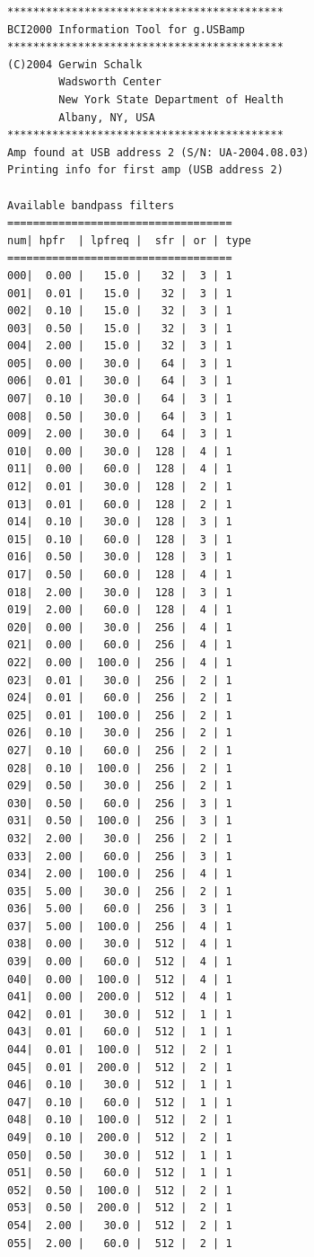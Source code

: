 \documentclass[letterpaper, oneside, 12pt]{article}
\begin{document}
\begin{verbatim}
*******************************************
BCI2000 Information Tool for g.USBamp
*******************************************
(C)2004 Gerwin Schalk
        Wadsworth Center
        New York State Department of Health
        Albany, NY, USA
*******************************************
Amp found at USB address 2 (S/N: UA-2004.08.03)
Printing info for first amp (USB address 2)

Available bandpass filters
===================================
num| hpfr  | lpfreq |  sfr | or | type
===================================
000|  0.00 |   15.0 |   32 |  3 | 1
001|  0.01 |   15.0 |   32 |  3 | 1
002|  0.10 |   15.0 |   32 |  3 | 1
003|  0.50 |   15.0 |   32 |  3 | 1
004|  2.00 |   15.0 |   32 |  3 | 1
005|  0.00 |   30.0 |   64 |  3 | 1
006|  0.01 |   30.0 |   64 |  3 | 1
007|  0.10 |   30.0 |   64 |  3 | 1
008|  0.50 |   30.0 |   64 |  3 | 1
009|  2.00 |   30.0 |   64 |  3 | 1
010|  0.00 |   30.0 |  128 |  4 | 1
011|  0.00 |   60.0 |  128 |  4 | 1
012|  0.01 |   30.0 |  128 |  2 | 1
013|  0.01 |   60.0 |  128 |  2 | 1
014|  0.10 |   30.0 |  128 |  3 | 1
015|  0.10 |   60.0 |  128 |  3 | 1
016|  0.50 |   30.0 |  128 |  3 | 1
017|  0.50 |   60.0 |  128 |  4 | 1
018|  2.00 |   30.0 |  128 |  3 | 1
019|  2.00 |   60.0 |  128 |  4 | 1
020|  0.00 |   30.0 |  256 |  4 | 1
021|  0.00 |   60.0 |  256 |  4 | 1
022|  0.00 |  100.0 |  256 |  4 | 1
023|  0.01 |   30.0 |  256 |  2 | 1
024|  0.01 |   60.0 |  256 |  2 | 1
025|  0.01 |  100.0 |  256 |  2 | 1
026|  0.10 |   30.0 |  256 |  2 | 1
027|  0.10 |   60.0 |  256 |  2 | 1
028|  0.10 |  100.0 |  256 |  2 | 1
029|  0.50 |   30.0 |  256 |  2 | 1
030|  0.50 |   60.0 |  256 |  3 | 1
031|  0.50 |  100.0 |  256 |  3 | 1
032|  2.00 |   30.0 |  256 |  2 | 1
033|  2.00 |   60.0 |  256 |  3 | 1
034|  2.00 |  100.0 |  256 |  4 | 1
035|  5.00 |   30.0 |  256 |  2 | 1
036|  5.00 |   60.0 |  256 |  3 | 1
037|  5.00 |  100.0 |  256 |  4 | 1
038|  0.00 |   30.0 |  512 |  4 | 1
039|  0.00 |   60.0 |  512 |  4 | 1
040|  0.00 |  100.0 |  512 |  4 | 1
041|  0.00 |  200.0 |  512 |  4 | 1
042|  0.01 |   30.0 |  512 |  1 | 1
043|  0.01 |   60.0 |  512 |  1 | 1
044|  0.01 |  100.0 |  512 |  2 | 1
045|  0.01 |  200.0 |  512 |  2 | 1
046|  0.10 |   30.0 |  512 |  1 | 1
047|  0.10 |   60.0 |  512 |  1 | 1
048|  0.10 |  100.0 |  512 |  2 | 1
049|  0.10 |  200.0 |  512 |  2 | 1
050|  0.50 |   30.0 |  512 |  1 | 1
051|  0.50 |   60.0 |  512 |  1 | 1
052|  0.50 |  100.0 |  512 |  2 | 1
053|  0.50 |  200.0 |  512 |  2 | 1
054|  2.00 |   30.0 |  512 |  2 | 1
055|  2.00 |   60.0 |  512 |  2 | 1

\end{verbatim}
\end{document}
